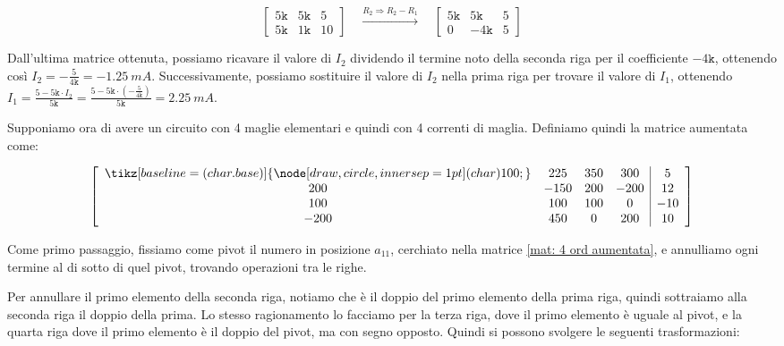 \begin{equation}
\left[
\begin{array}{cc|c}
5\texttt{k} & 5\texttt{k} & 5 \\
5\texttt{k} & 1\texttt{k} & 10
\end{array}
\right]
\quad \xrightarrow{R_2 \Rightarrow R_2 - R_1} \quad
\left[
\begin{array}{cc|c}
5\texttt{k} & 5\texttt{k} & 5 \\
0 & -4\texttt{k} & 5
\end{array}
\right]
\end{equation}

Dall'ultima matrice ottenuta, possiamo ricavare il valore di $I_2$ dividendo il termine noto della seconda riga per il coefficiente $-4\texttt{k}$, ottenendo così $I_2 = -\frac{5}{4\texttt{k}} = \SI{-1.25}{mA}$. Successivamente, possiamo sostituire il valore di $I_2$ nella prima riga per trovare il valore di $I_1$, ottenendo $I_1 = \frac{5 - 5\texttt{k} \cdot I_2}{5\texttt{k}} = \frac{5 - 5\texttt{k} \cdot (-\frac{5}{4\texttt{k}})}{5\texttt{k}} = \SI{2.25}{mA}$.

Supponiamo ora di avere un circuito con 4 maglie elementari e quindi con 4 correnti di maglia. Definiamo quindi la matrice aumentata come:

\begin{equation}
	\left[
		\begin{array}{c c c c | c}
		\tikz[baseline=(char.base)]{\node[draw,circle,inner sep=1pt] (char) {100};} & 225 & 350 & 300 & 5 \\
		200 & -150 & 200 & -200 & 12 \\
		100 & 100 & 100 & 0 & -10 \\
		-200 & 450 & 0 & 200 & 10 
		\end{array}
	\right]
	\label{mat: 4 ord aumentata}
\end{equation}

Come primo passaggio, fissiamo come pivot il numero in posizione $a_{11}$, cerchiato nella matrice \ref{mat: 4 ord aumentata}, e annulliamo ogni termine al di sotto di quel pivot, trovando operazioni tra le righe. 

Per annullare il primo elemento della seconda riga, notiamo che è il doppio del primo elemento della prima riga, quindi sottraiamo alla seconda riga il doppio della prima. Lo stesso ragionamento lo facciamo per la terza riga, dove il primo elemento è uguale al pivot, e la quarta riga dove il primo elemento è il doppio del pivot, ma con segno opposto. Quindi si possono svolgere le seguenti trasformazioni:

